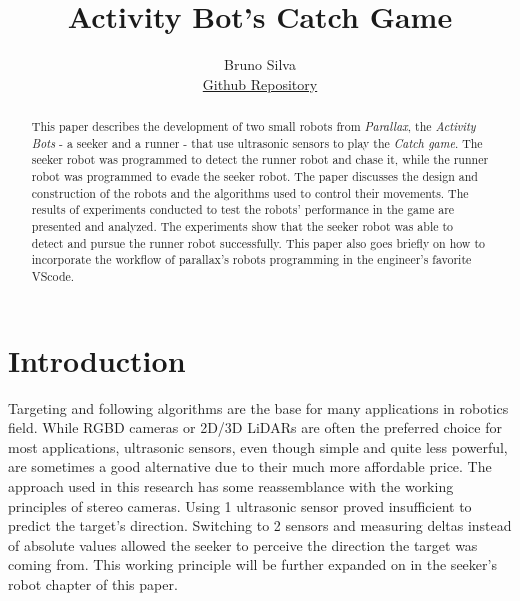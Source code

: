 \documentclass[sigconf,nonacm]{acmart}
\begin{document}
\title{Activity Bot's Catch Game}

\author{Bruno Silva \\ \href{https://github.com/brunofavs/propeller_cath_game}{Github Repository} }

    
    
    \begin{abstract}
    
This paper describes the development of two small robots from \textit{Parallax}, the \textit{Activity
Bots} - a seeker and a runner
- that use ultrasonic sensors to play the \textit{Catch game}. The seeker robot was
programmed to detect the runner robot and chase it, while the runner robot was
programmed to evade the seeker robot. The paper discusses the design and
construction of the robots and the algorithms used to control their movements.
The results of experiments conducted to test the robots' performance in the game
are presented and analyzed. The experiments show that the seeker robot was able
to detect and pursue the runner robot successfully.
This paper also goes briefly on how to incorporate the workflow of parallax's
robots programming in the engineer's favorite VScode.
 

    \end{abstract}
    
    \maketitle



\section{Introduction}

    Targeting and following algorithms are the base for many
    applications in robotics field. While RGBD cameras or 2D/3D LiDARs are often
    the preferred choice for most applications, ultrasonic sensors, even though
    simple and quite less powerful, are sometimes a good alternative due to
    their much more affordable price. The approach used in this research has
    some reassemblance with the working principles of stereo cameras. Using 1
    ultrasonic sensor proved insufficient to predict the target's direction.
    Switching to 2 sensors and measuring deltas instead of absolute values
    allowed the seeker to perceive the direction the target was coming from.
    This working principle will be further expanded on in the seeker's robot
    chapter of this paper.
\end{document}
